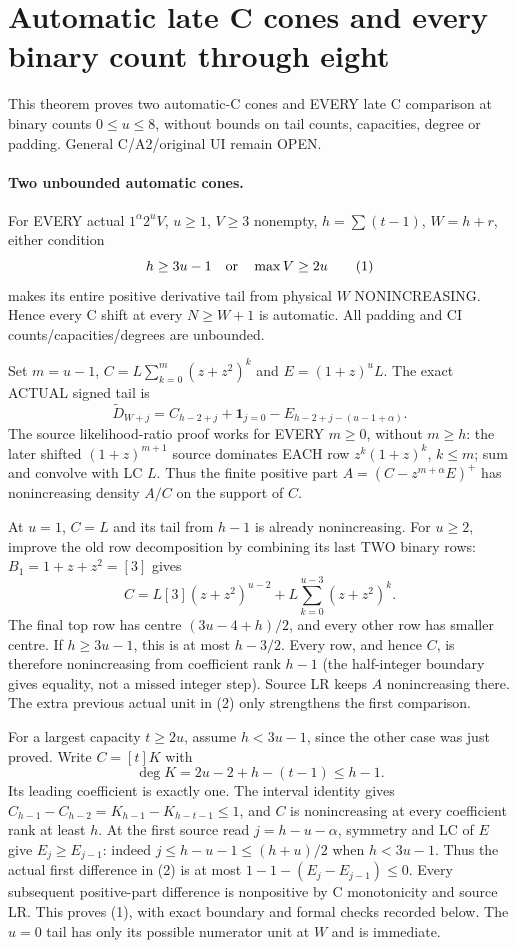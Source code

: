 \section{Automatic late C cones and every binary count through eight}
This theorem proves two automatic-C cones and EVERY late C comparison
at binary counts $0\le u\le8$, without bounds on tail counts,
capacities, degree or padding. General C/A2/original UI remain OPEN.

\paragraph{Two unbounded automatic cones.}
For EVERY actual $1^\alpha2^uV$, $u\ge1$, $V\ge3$ nonempty,
$h=\sum(t-1)$, $W=h+r$, either condition
\[
                h\ge3u-1\quad\hbox{or}\quad\max V\ge2u     \tag{1}
\]
makes its entire positive derivative tail from physical
$W$ NONINCREASING. Hence every C shift at every $N\ge W+1$
is automatic. All padding and CI counts/capacities/degrees are unbounded.

Set $m=u-1$, $C=L\sum_{k=0}^m(z+z^2)^k$ and
$E=(1+z)^uL$. The exact ACTUAL signed tail is
\[
 \widetilde D_{W+j}=C_{h-2+j}+\mathbf1_{j=0}
                         -E_{h-2+j-(u-1+\alpha)}.      \tag{2}
\]
The source likelihood-ratio proof works for EVERY $m\ge0$, without
$m\ge h$: the later shifted $(1+z)^{m+1}$ source dominates EACH
row $z^k(1+z)^k$, $k\le m$; sum and convolve with LC $L$.
Thus the finite positive part $A=(C-z^{m+\alpha}E)^+$ has
nonincreasing density $A/C$ on the support of $C$.

At $u=1$, $C=L$ and its tail from $h-1$ is already nonincreasing.
For $u\ge2$, improve the old row decomposition by combining its
last TWO binary rows: $B_1=1+z+z^2=[3]$ gives
\[
 C=L[3](z+z^2)^{u-2}
                      +L\sum_{k=0}^{u-3}(z+z^2)^k.
\]
The final top row has centre $(3u-4+h)/2$, and every other row
has smaller centre. If $h\ge3u-1$, this is at most $h-3/2$.
Every row, and hence $C$, is therefore nonincreasing from coefficient
rank $h-1$ (the half-integer boundary gives equality, not a missed
integer step). Source LR keeps $A$ nonincreasing there. The extra
previous actual unit in (2) only strengthens the first comparison.

For a largest capacity $t\ge2u$, assume $h<3u-1$, since the other
case was just proved. Write $C=[t]K$ with
\[
 \deg K=2u-2+h-(t-1)\le h-1.
\]
Its leading coefficient is exactly one. The interval identity gives
$C_{h-1}-C_{h-2}=K_{h-1}-K_{h-t-1}\le1$,
and $C$ is nonincreasing at every coefficient rank at least $h$.
At the first source read $j=h-u-\alpha$, symmetry and LC of $E$
give $E_j\ge E_{j-1}$: indeed
$j\le h-u-1\le(h+u)/2$ when $h<3u-1$.
Thus the actual first difference in (2) is at most
$1-1-(E_j-E_{j-1})\le0$. Every subsequent positive-part difference
is nonpositive by C monotonicity and source LR. This proves (1),
with exact boundary and formal checks recorded below. The $u=0$ tail has only
its possible numerator unit at $W$ and is immediate.

